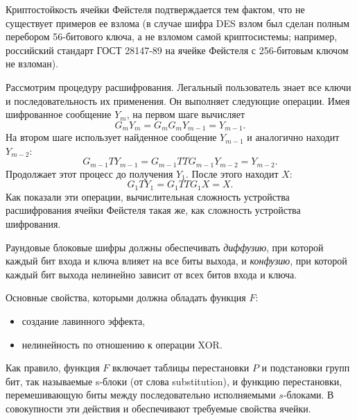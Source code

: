 Криптостойкость ячейки Фейстеля подтверждается тем фактом, что не существует примеров ее взлома (в случае шифра DES взлом был сделан полным перебором 56-битового ключа, а не взломом самой криптосистемы; например, российский стандарт ГОСТ 28147-89 на ячейке Фейстеля с 256-битовым ключом не взломан).

Рассмотрим процедуру расшифрования. Легальный пользователь знает все ключи и последовательность их применения. Он выполняет следующие операции. Имея шифрованное сообщение $Y_{m}$, на первом шаге вычисляет
\[
    G_{m} Y_{m} = G_{m} G_{m} Y_{m-1} = Y_{m-1}.
\]
На втором шаге использует найденное сообщение $Y_{m-1}$ и аналогично находит $Y_{m-2}$:
\[
    G_{m-1} T Y_{m-1} = G_{m-1} T T G_{m-1} Y_{m-2} = Y_{m-2}.
\]
Продолжает этот процесс до получения $Y_{1}$. После этого находит $X$:
\[
    G_{1} T Y_{1} = G_{1} T T G_{1} X = X.
\]
Как показали эти операции, вычислительная сложность устройства расшифрования ячейки Фейстеля такая же, как сложность устройства шифрования.

Раундовые блоковые шифры должны обеспечивать \emph{диффузию}, при которой каждый бит входа и ключа влияет на все биты выхода, и \emph{конфузию}, при которой каждый бит выхода нелинейно зависит от всех битов входа и ключа.

Основные свойства, которыми должна обладать функция $F$:
\begin{itemize}
    \item создание лавинного эффекта,
    \item нелинейность по отношению к операции XOR.
\end{itemize}

Как правило, функция $F$ включает таблицы перестановки $P$ и подстановки групп бит, так называемые s-блоки (от слова substitution), и функцию перестановки, перемешивающую биты между последовательно исполняемыми $s$-блоками. В совокупности эти действия и обеспечивают требуемые свойства ячейки.
